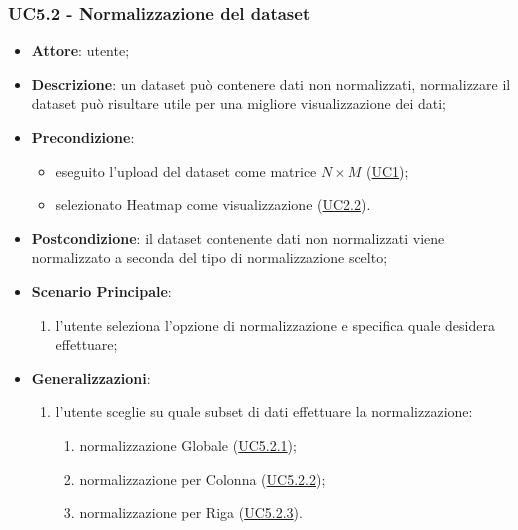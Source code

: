     \subsubsection{UC5.2 - Normalizzazione del dataset}
    \label{uc5.2}
    \begin{itemize}
    \item \textbf{Attore}: utente;
    \item \textbf{Descrizione}: un dataset può contenere dati non normalizzati, normalizzare il dataset può risultare utile per una migliore visualizzazione dei dati;
    \item \textbf{Precondizione}: 
    \begin{itemize}
        \item eseguito l'upload del dataset come matrice $N\times M$ (\hyperref[uc1]{UC1});
        \item selezionato Heatmap come visualizzazione (\hyperref[uc2.2]{UC2.2}).
    \end{itemize}  
    \item \textbf{Postcondizione}: il dataset contenente dati non normalizzati viene normalizzato a seconda del tipo di normalizzazione scelto;
    \item \textbf{Scenario Principale}:
    \begin{enumerate}
        \item l'utente seleziona l'opzione di normalizzazione e specifica quale desidera effettuare;
    \end{enumerate}  
    \item \textbf{Generalizzazioni}: 
     \begin{enumerate}
            \item l'utente sceglie su quale subset di dati effettuare la normalizzazione:
                \begin{enumerate}
                    \item normalizzazione Globale (\hyperref[uc5.2.1]{UC5.2.1});
                    \item normalizzazione per Colonna (\hyperref[uc5.2.2]{UC5.2.2});
                    \item normalizzazione per Riga (\hyperref[uc5.2.3]{UC5.2.3}).
                \end{enumerate}
        \end{enumerate}  
    \end{itemize}
    
